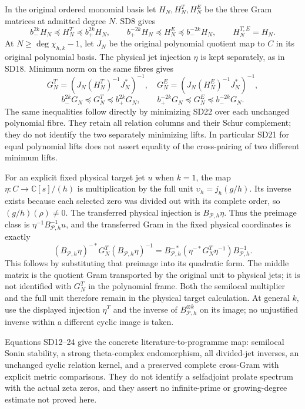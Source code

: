 \documentclass[11pt]{article}
\newcommand{\C}{\mathbb C}
\begin{document}
In the original ordered monomial basis let $H_N,H_N^T,H_N^E$
be the three Gram matrices at admitted degree $N$. SD8 gives
\[
 b_-^{2k}H_N\preceq H_N^T\preceq b_+^{2k}H_N,\qquad
 b_+^{-2k}H_N\preceq H_N^E\preceq b_-^{-2k}H_N,\qquad
 H_N^{T,E}=H_N.                                               \tag{SD22}
\]
At $N\ge\deg\chi_{h,k}-1$, let $J_N$ be the original polynomial
quotient map to $C$ in its original polynomial basis. The physical
jet injection $\eta$ is kept separately, as in SD18. Minimum norm on the same
fibres gives
\[
 G_N^T=(J_N(H_N^T)^{-1}J_N^*)^{-1},\quad
 G_N^E=(J_N(H_N^E)^{-1}J_N^*)^{-1},
\]
\[
 b_-^{2k}G_N\preceq G_N^T\preceq b_+^{2k}G_N,\qquad
 b_+^{-2k}G_N\preceq G_N^E\preceq b_-^{-2k}G_N.                \tag{SD23}
\]
The same inequalities follow directly by minimizing SD22 over
each unchanged polynomial fibre. They retain all relation columns
and their Schur complement; they do not identify the two separately
minimizing lifts. In particular SD21 for equal polynomial lifts
does not assert equality of the cross-pairing of two different
minimum lifts.

For an explicit fixed physical target jet $u$ when $k=1$, the
map $\eta:C\to\C[s]/(h)$ is multiplication by the full unit
$\upsilon_h=j_h(g/h)$. Its inverse exists because each selected
zero was divided out with its complete order, so
$(g/h)(\rho)\ne0$. The transferred physical injection is $B_{\mathcal
P,h}\eta$. Thus the preimage class is
$\eta^{-1}B_{\mathcal P,h}^{-1}u$, and the transferred Gram in
the fixed physical coordinates is exactly
\[
 (B_{\mathcal P,h}\eta)^{-*}G_N^T
              (B_{\mathcal P,h}\eta)^{-1}
 =B_{\mathcal P,h}^{-*}
       (\eta^{-*}G_N^T\eta^{-1})B_{\mathcal P,h}^{-1}.
                                                               \tag{SD24}
\]
This follows by substituting that preimage into its quadratic form.
The middle matrix is the quotient Gram transported by the original
unit to physical jets; it is not identified with $G_N^T$ in the
polynomial frame. Both the semilocal multiplier and the full unit
therefore remain in the physical target calculation.
At general $k$, use the displayed injection $\eta^T$ and the inverse
of $B_{\mathcal P,h}^{\otimes k}$ on its image; no unjustified
inverse within a different cyclic image is taken.

Equations SD12--24 give the concrete literature-to-programme map:
semilocal Sonin stability, a strong theta-complex endomorphism,
all divided-jet inverses, an unchanged cyclic relation kernel,
and a preserved complete cross-Gram with explicit metric comparisons.
They do not identify a selfadjoint prolate spectrum with the actual
zeta zeros, and they assert no infinite-prime or growing-degree
estimate not proved here.
\end{document}
